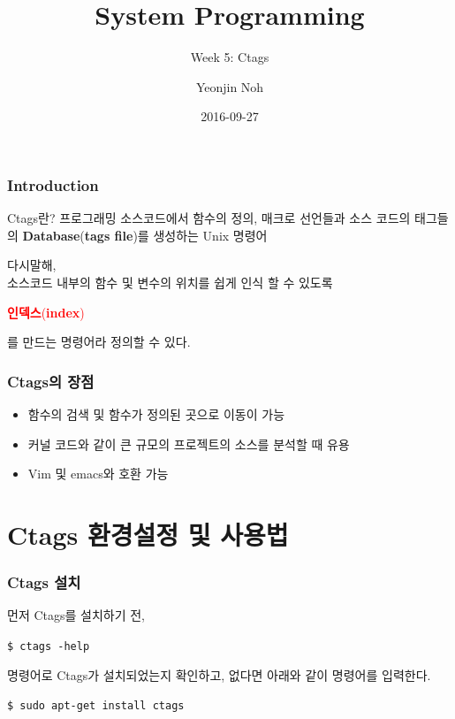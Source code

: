\documentclass[newPxFont,sthlmFooter,nooffset]{beamer}
\title{System Programming}
\subtitle{Week 5: Ctags}
\author[YJN]{Yeonjin Noh}
\institute{\href{mailto:nyg0813@gmail.com}{nyg0813@gmail.com}\\\url{http://esos.hanyang.ac.kr}\\Esos Lab. Hanyang University}
\date{2016-09-27}
\begin{document}
\frame[plain]{\titlepage} 




\begin{frame}[t]
  \frametitle{Introduction}
\begin{block}{Ctags란?}
\medskip
프로그래밍 소스코드에서 함수의 정의, 매크로 선언들과 소스 코드의 태그들의 \textbf{Database}(\textbf{tags file})를 생성하는 Unix 명령어
\end{block}
\smallskip
다시말해, \\
\bigskip
소스코드 내부의 함수 및 변수의 위치를 쉽게 인식 할 수 있도록\\ 
\begin{Large}
\textcolor{red}{\textbf{인덱스}(\textbf{index})}
\end{Large}를 만드는 명령어라 정의할 수 있다.
\end{frame}
\begin{frame}[t]
  \frametitle{Ctags의 장점}
\begin{itemize}
\item 함수의 검색 및 함수가 정의된 곳으로 이동이 가능
\item 커널 코드와 같이 큰 규모의 프로젝트의 소스를 분석할 때 유용
\item Vim 및 emacs와 호환 가능
\end{itemize}
\end{frame}
\section{Ctags 환경설정 및 사용법}
\begin{frame}[containsverbatim, t]
  \frametitle{Ctags 설치}
먼저 Ctags를 설치하기 전, 
\begin{mdframed}[backgroundcolor=lightgray,hidealllines=true]
\texttt{\textcolor[rgb]{0,0,0}{\$ ctags -help}}
\end{mdframed}
\bigskip
명령어로 Ctags가 설치되었는지 확인하고, 없다면 아래와 같이 명령어를 입력한다.
\begin{mdframed}[backgroundcolor=lightgray,hidealllines=true]
\texttt{\textcolor[rgb]{0,0,0}{\$ sudo apt-get install ctags}}
\end{mdframed}
\bigskip
\end{frame}
\end{document}
